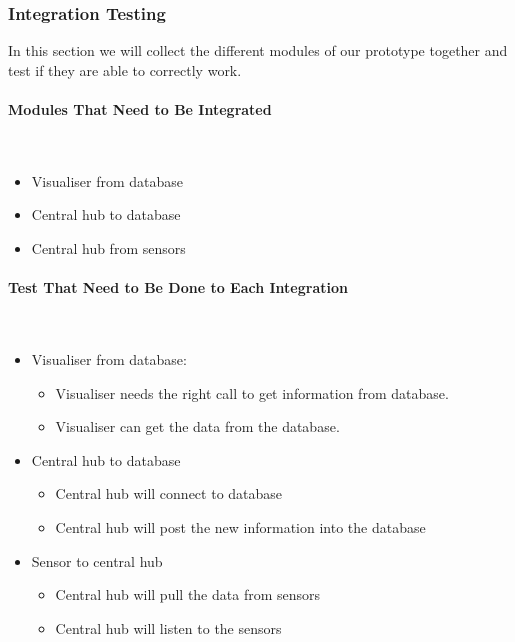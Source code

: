 \documentclass[../document]{subfiles}
\begin{document}
\subsubsection{Integration Testing}
In this section we will collect the different modules of our prototype together and test if they are able to correctly work.

\paragraph{Modules That Need to Be Integrated} \ \\
\begin{itemize}
	\item
	Visualiser from database
	\item
	Central hub to database
	\item
	Central hub from sensors
\end{itemize}

\paragraph{Test That Need to Be Done to Each Integration} \ \\
\begin{itemize}
	\item
	Visualiser from database:
	\begin{itemize}
		\item
		Visualiser needs the right call to get information from database.
		\item
		Visualiser can get the data from the database.
	\end{itemize}
	\item
	Central hub to database
	\begin{itemize}
		\item
		Central hub will connect to database
		\item
		Central hub will post the new information into the database
	\end{itemize}
	\item
	Sensor to central hub
	\begin{itemize}
		\item
		Central hub will pull the data from sensors
		\item
		Central hub will listen to the sensors
	\end{itemize}
\end{itemize}
\end{document}
